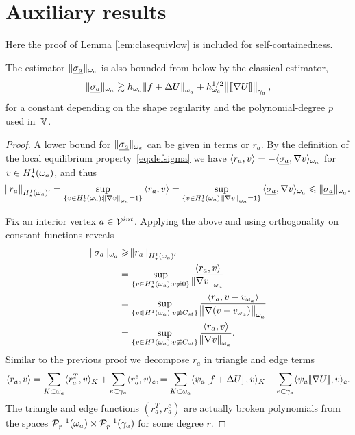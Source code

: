 \documentclass[thesis.tex]{subfiles}
\begin{document}
\section{Auxiliary results}
\label{sec:aux}
Here the proof of Lemma \ref{lem:clasequivlow} is included for self-containedness.
  \begin{lemstar}
  The estimator $\| \underline{\sigma_a} \|_{\omega_a}$ is also bounded from below by the classical estimator,
  \[
    \| \underline{\sigma_a} \|_{\omega_a} \gtrsim h_{\omega_a}\norm{f + \Delta U}_{\omega_a} + h^{1/2}_{\omega_a} \norm{\llbracket \nabla U  \rrbracket}_{\gamma_a},
  \]
  for a constant depending on the shape regularity and the polynomial-degree $p$ used in~$\mathbb{V}$.
  \end{lemstar}
\begin{proof}
  A lower bound for $\| \underline{\sigma_a} \|_{\omega_a}$ can be given in terms or $r_a$.
  By the definition of the local equilibrium property~\eqref{eq:defsigma} we have $\langle r_a, v \rangle = - \langle \underline{\sigma_a}, \nabla v \rangle_{\omega_a}$ for $v \in H_\star^1(\omega_a)$,
  and thus
  \[
    \norm{r_a}_{H_\star^1(\omega_a)'} = \sup_{\{v \in H_\star^1(\omega_a) : \norm{\nabla v}_{\omega_a} = 1\}} {\langle r_a, v \rangle} = \sup_{\{v \in H_\star^1(\omega_a) : \norm{\nabla v}_{\omega_a}=1\}} {\langle \underline{\sigma_a}, \nabla v \rangle_{\omega_a}} \leqslant \| \underline{\sigma_a} \|_{\omega_a}.
  \]

  Fix an interior vertex  $a \in \mathcal{V}^{int}$. Applying the above and using orthogonality on constant functions reveals  
  \begin{align*}
    \| \underline{\sigma_a} \|_{\omega_a} &\geqslant \norm{r_a}_{H^1_\star(\omega_a)'} \\
    &= \sup_{\{v \in H^1_\star(\omega_a) : v \ne 0\}} { \langle r_a, v \rangle \over \norm{\nabla v}_{\omega_a}} \\
    &= \sup_{\{v \in H^1(\omega_a) : v \not \equiv C_{st}\}} { \langle r_a, v - v_{\omega_a} \rangle \over \norm{\nabla (v - v_{\omega_a})}_{\omega_a}} \\
    &= \sup_{\{v \in H^1(\omega_a) : v \not \equiv C_{st}\}} { \langle r_a, v \rangle \over \norm{\nabla v}_{\omega_a}}.
  \end{align*}
  Similar to the previous proof we decompose $r_a$ in triangle and edge terms
  \[
    \langle r_a,v \rangle = \sum_{K\subset \omega_a} \langle{r^T_a, v}\rangle_K + \sum_{e \subset \gamma_a} \langle r^e_a, v \rangle_e,
    = \sum_{K\subset \omega_a} \langle{\psi_a \left [f+\Delta U \right], v}\rangle_K + \sum_{e \subset \gamma_a} \langle \psi_a \llbracket \nabla U \rrbracket, v \rangle_e.
  \]
  The triangle and edge functions $(r^T_a, r^e_a)$ are actually broken polynomials from the spaces $\mathcal{P}_r^{-1}(\omega_a)\times \mathcal{P}_r^{-1}(\gamma_a)$ for some degree $r$.


\end{proof}
\end{document}
